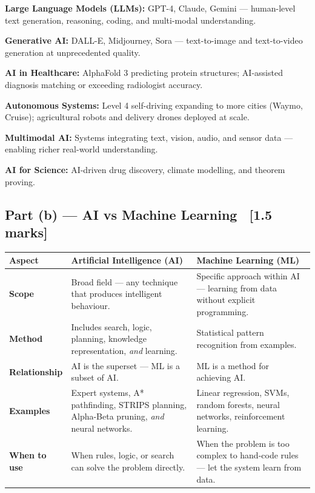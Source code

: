 \documentclass[12pt, a4paper]{article}
\begin{document}
\begin{keypoints}
  \item \textbf{Large Language Models (LLMs):} GPT-4, Claude, Gemini — human-level text generation, reasoning, coding, and multi-modal understanding.
  \item \textbf{Generative AI:} DALL-E, Midjourney, Sora — text-to-image and text-to-video generation at unprecedented quality.
  \item \textbf{AI in Healthcare:} AlphaFold 3 predicting protein structures; AI-assisted diagnosis matching or exceeding radiologist accuracy.
  \item \textbf{Autonomous Systems:} Level 4 self-driving expanding to more cities (Waymo, Cruise); agricultural robots and delivery drones deployed at scale.
  \item \textbf{Multimodal AI:} Systems integrating text, vision, audio, and sensor data — enabling richer real-world understanding.
  \item \textbf{AI for Science:} AI-driven drug discovery, climate modelling, and theorem proving.
\end{keypoints}

\subsection{Part (b) — AI vs Machine Learning \ [1.5 marks]}

\begin{center}
\renewcommand{\arraystretch}{1.4}
\begin{tabular}{p{3cm}|p{6.5cm}|p{6.5cm}}
\toprule
\textbf{Aspect} & \textbf{Artificial Intelligence (AI)} & \textbf{Machine Learning (ML)} \\
\midrule
\textbf{Scope} &
  Broad field — any technique that produces intelligent behaviour. &
  Specific approach within AI — learning from data without explicit programming. \\
\midrule
\textbf{Method} &
  Includes search, logic, planning, knowledge representation, \emph{and} learning. &
  Statistical pattern recognition from examples. \\
\midrule
\textbf{Relationship} &
  AI is the superset — ML is a subset of AI. &
  ML is a method for achieving AI. \\
\midrule
\textbf{Examples} &
  Expert systems, A* pathfinding, STRIPS planning, Alpha-Beta pruning, \emph{and} neural networks. &
  Linear regression, SVMs, random forests, neural networks, reinforcement learning. \\
\midrule
\textbf{When to use} &
  When rules, logic, or search can solve the problem directly. &
  When the problem is too complex to hand-code rules — let the system learn from data. \\
\bottomrule
\end{tabular}
\end{center}
\end{document}
